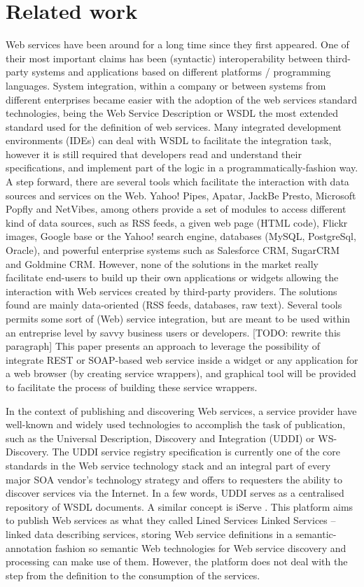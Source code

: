 
\section{Related work}
\label{sec:related_work}

Web services have been around for a long time since they first appeared. One of their most important claims has been (syntactic) interoperability between third-party systems and applications based on different platforms / programming languages. System integration, within a company or between systems from different enterprises became easier with the adoption of the web services standard technologies, being the Web Service Description or WSDL the most extended standard used for the definition of web services. Many integrated development environments (IDEs) can deal with WSDL to facilitate the integration task, however it is still required that developers read and understand their specifications, and implement part of the logic in a programmatically-fashion way. A step forward, there are several tools which facilitate the interaction with data sources and services on the Web. Yahoo! Pipes, Apatar, JackBe Presto, Microsoft Popfly and NetVibes, among others provide a set of modules to access different kind of data sources, such as RSS feeds, a given web page (HTML code), Flickr images, Google base or the Yahoo! search engine, databases (MySQL, PostgreSql, Oracle), and powerful enterprise systems such as Salesforce CRM, SugarCRM and Goldmine CRM. However, none of the solutions in the market really facilitate end-users to build up their own applications or widgets allowing the interaction with Web services created by third-party providers. The solutions found are mainly data-oriented (RSS feeds, databases, raw text). Several tools permits some sort of (Web) service integration, but are meant to be used within an entreprise level by savvy business users or developers. [TODO: rewrite this paragraph] This paper presents an approach to leverage the possibility of integrate REST or SOAP-based web service inside a widget or any application for a web browser (by creating service wrappers), and graphical tool will be provided to facilitate the process of building these service wrappers.

In the context of publishing and discovering Web services, a service provider have well-known and widely used technologies to accomplish the task of publication, such as the Universal Description, Discovery and Integration (UDDI) or WS-Discovery. The UDDI service registry specification \cite{uddi2004} is currently one of the core standards in the Web service technology stack and an integral part of every major SOA vendor's technology strategy and offers to requesters the ability to discover services via the Internet. In a few words, UDDI serves as a centralised repository of WSDL documents. A similar concept is iServe \cite{pedrinaci_ores2010}. This platform aims to publish Web services as what they called Lined Services Linked Services --linked data describing services, storing Web service definitions in a semantic-annotation fashion so semantic Web technologies for Web service discovery and processing can make use of them. However, the platform does not deal with the step from the definition to the consumption of the services.

